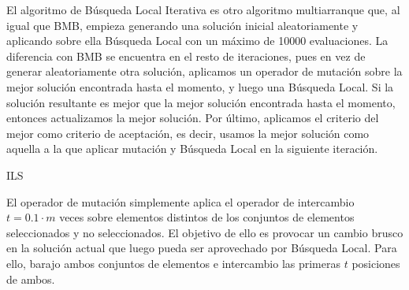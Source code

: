 \documentclass[10pt,a4paper]{article}
\begin{document}
El algoritmo de Búsqueda Local Iterativa es otro algoritmo multiarranque que, al igual que BMB, empieza generando una solución inicial aleatoriamente y aplicando sobre ella Búsqueda Local con un máximo de 10000 evaluaciones. La diferencia con BMB se encuentra en el resto de iteraciones, pues en vez de generar aleatoriamente otra solución, aplicamos un operador de mutación sobre la mejor solución encontrada hasta el momento, y luego una Búsqueda Local. Si la solución resultante es mejor que la mejor solución encontrada hasta el momento, entonces actualizamos la mejor solución. Por último, aplicamos el criterio del mejor como criterio de aceptación, es decir, usamos la mejor solución como aquella a la que aplicar mutación y Búsqueda Local en la siguiente iteración.\\

\begin{algorithm}[H]
	\caption{ILS}
\end{algorithm}

El operador de mutación simplemente aplica el operador de intercambio $t=0.1 \cdot m$ veces sobre elementos distintos de los conjuntos de elementos seleccionados y no seleccionados. El objetivo de ello es provocar un cambio brusco en la solución actual que luego pueda ser aprovechado por Búsqueda Local. Para ello, barajo ambos conjuntos de elementos e intercambio las primeras $t$ posiciones de ambos.\\
\end{document}
